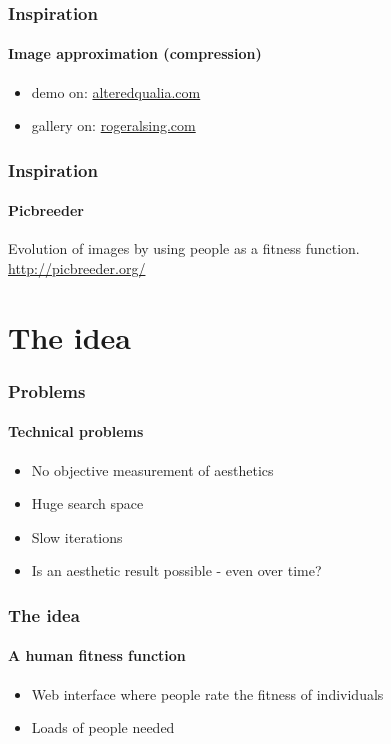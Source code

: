 \documentclass{beamer}
\begin{document}
\begin{frame}
	\frametitle{Inspiration}
	\framesubtitle{Image approximation (compression)}
	
	\begin{itemize}
		\item<1-> demo on: \href{http://alteredqualia.com/visualization/evolve/}{alteredqualia.com}
		\item<2-> gallery on: \href{http://rogeralsing.com/2008/12/11/genetic-gallery/}{rogeralsing.com}
	\end{itemize}
\end{frame}

\begin{frame}
	\frametitle{Inspiration}
	\framesubtitle{Picbreeder}
	
	Evolution of images by using people as a fitness function.
	\\
	\href{http://picbreeder.org/}{http://picbreeder.org/} 
\end{frame}




\section{The idea} %
\label{sg:sec:the_idea}

\begin{frame}
	\frametitle{Problems}
	\framesubtitle{Technical problems}
	
	\begin{itemize}
		\item<1-> No objective measurement of aesthetics
		\item<2-> Huge search space
		\item<3-> Slow iterations
		\item<4-> Is an aesthetic result possible - even over time?
	\end{itemize}
	
\end{frame}

\begin{frame}
	\frametitle{The idea}
	\framesubtitle{A human fitness function}
	\begin{itemize}
		\item<1-> Web interface where people rate the fitness of individuals
		\item<2-> Loads of people needed
	\end{itemize}
	
\end{frame}
\end{document}
